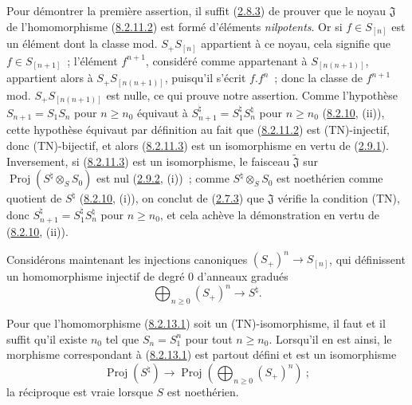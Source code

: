Pour démontrer la première assertion, il suffit
(\hyperref[II.2.8.3-fr]{2.8.3}) de prouver que le noyau $\mathfrak{J}$ de
l'homomorphisme (\hyperref[II.8.2.11.2-fr]{8.2.11.2}) est formé d'éléments
\emph{nilpotents}. Or si $f\in S_{[n]}$ est un élément dont la classe mod.
$S_+S_{[n]}$ appartient à ce noyau, cela signifie que $f\in S_{[n+1]}$~;
l'élément $f^{n+1}$, considéré comme appartenant à $S_{[n(n+1)]}$, appartient
alors à $S_+S_{[n(n+1)]}$, puisqu'il s'écrit $f.f^n$~; donc la classe de
$f^{n+1}$ mod. $S_+S_{[n(n+1)]}$ est nulle, ce qui prouve notre assertion.
Comme l'hypothèse $S_{n+1}=S_1S_n$ pour $n\geq n_0$ équivaut à
$S_{n+1}^{\natural}=S_1^{\natural}S_n^{\natural}$ pour $n\geq n_0$
(\hyperref[II.8.2.10-fr]{8.2.10}, (ii)), cette hypothèse équivaut par définition
au fait que (\hyperref[II.8.2.11.2-fr]{8.2.11.2}) est (TN)-injectif, donc
(TN)-bijectif, et alors (\hyperref[II.8.2.11.3-fr]{8.2.11.3}) est un
isomorphisme en vertu de (\hyperref[II.2.9.1-fr]{2.9.1}). Inversement, si
(\hyperref[II.8.2.11.3-fr]{8.2.11.3}) est un isomorphisme, le faisceau
$\widetilde{\mathfrak{J}}$ sur
$\operatorname{Proj}(S^{\natural}\otimes_S S_0)$ est nul
(\hyperref[II.2.9.2-fr]{2.9.2}, (i))~; comme
$S^{\natural}\otimes_S S_0$ est noethérien comme quotient de $S^{\natural}$
(\hyperref[II.8.2.10-fr]{8.2.10}, (i)), on conclut de
(\hyperref[II.2.7.3-fr]{2.7.3}) que $\mathfrak{J}$ vérifie la condition (TN),
donc $S_{n+1}^{\natural}=S_1^{\natural}S_n^{\natural}$ pour $n\geq n_0$, et
cela achève la démonstration en vertu de
(\hyperref[II.8.2.10-fr]{8.2.10}, (ii)).

\begin{env}[8.2.13]
\label{II.8.2.13-fr}
Considérons maintenant les injections canoniques $(S_+)^n\to S_{[n]}$, qui
définissent un homomorphisme injectif de degré $0$ d'anneaux gradués
\begin{equation}
\label{II.8.2.13.1-fr}
  \bigoplus_{n\geq0}(S_+)^n\to S^{\natural}.
\tag{8.2.13.1}
\end{equation}
\end{env}

\begin{proposition}[8.2.14]
\label{II.8.2.14-fr}
Pour que l'homomorphisme \textup{(\hyperref[II.8.2.13.1-fr]{8.2.13.1})} soit un
\textup{(TN)}-isomorphisme, il faut et il suffit qu'il existe $n_0$ tel que
$S_n=S_1^n$ pour tout $n\geq n_0$. Lorsqu'il en est ainsi, le morphisme
correspondant à \textup{(\hyperref[II.8.2.13.1-fr]{8.2.13.1})} est partout défini et
est un isomorphisme
\[
  \operatorname{Proj}(S^{\natural})\to
  \operatorname{Proj}\left(\bigoplus_{n\geq0}(S_+)^n\right)~;
\]
la réciproque est vraie lorsque $S$ est noethérien.
\end{proposition}

